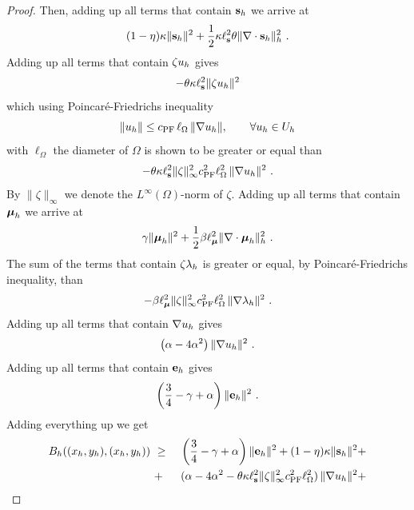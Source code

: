 \begin{proof}
	Then, adding up all terms that contain $\mathbf{s}_h$ we arrive at
	\begin{equation}
		(1-\eta) \kappa \|\mathbf{s}_h\|^2 + \frac12 \kappa \ell_{\mathbf{s}}^2 
		\theta  \|\nabla\cdot \mathbf{s}_h\|_h^2~.
		\label{eq:term1}
	\end{equation}
	Adding up all terms that contain $\zeta u_h$ gives
	$$
	-\theta \kappa \ell_{\mathbf{s}}^2 \|\zeta u_h\|^2
	$$
	which using Poincar\'e-Friedrichs inequality
	\begin{equation}
		\|u_h\| \leq c_{\mbox{\scriptsize{PF}}}\,\ell_{\Omega}\,\|\nabla u_h\|, \qquad \forall u_h\in U_h
		\label{eq:poincare}
	\end{equation}
	with $\ell_{\Omega}$ the diameter of $\Omega$ is shown to be greater or equal than 
	\begin{equation}
		- {\theta \kappa \ell_{\mathbf{s}}^2 \|\zeta\|_{\infty}^2 c_{\mbox{\scriptsize{PF}}}^2 \ell_{\Omega}^2}\,\|\nabla u_h \|^2~.
		\label{eq:term2}
	\end{equation}
	By $\|\zeta\|_{\infty}$ we denote the $L^{\infty}(\Omega)$-norm of $\zeta$. Adding up all terms that contain $\boldsymbol{\mu}_h$ we arrive at
	\begin{equation}
		\gamma \|\boldsymbol{\mu}_h\|^2 +\frac12 \beta\ell_{\boldsymbol{\mu}}^2  \|\nabla \cdot \boldsymbol{\mu}_h \|_h^2~.
		\label{eq:term4}
	\end{equation}
	The sum of the terms that contain $\zeta \lambda_h$ is greater or equal, by Poincaré-Friedrichs inequality, than
	\begin{equation}
		- \beta \ell_{\boldsymbol{\mu}}^2 \|\zeta\|_{\infty}^2 c_{\mbox{\scriptsize{PF}}}^2 \ell_{\Omega}^2\,\|\nabla \lambda_h \|^2~.
		\label{eq:term5}
	\end{equation}
	Adding up all terms that contain $\nabla u_h$ gives
	\begin{equation}
		\left ( \alpha - 4 \alpha^2 \right )
		\|\nabla u_h\|^2~.
		\label{eq:term6}
	\end{equation}
	Adding up all terms that contain $\mathbf{e}_h$ gives
	\begin{equation}
		\left ( \frac34-\gamma + \alpha \right ) \|\mathbf{e}_h\|^2~.
		\label{eq:term7}
	\end{equation}
	Adding everything up we get
	\begin{eqnarray}
		B_h((x_h,y_h),(x_h,y_h))~&\geq&~ \left (\frac34 -\gamma+\alpha \right ) \|\eP_h\|^2 + (1-\eta)\kappa \|\sP_h\|^2 + \nonumber \\
		~&+&~ (\alpha - 4 \alpha^2 - \theta \kappa \ell_{\sP}^2 \|\zeta\|_{\infty}^2 c_{\mbox{\scriptsize{PF}}}^2 \ell_{\Omega}^2)\, \|\nabla \uP_h\|^2 + \nonumber \\

\end{eqnarray}
\end{proof}
